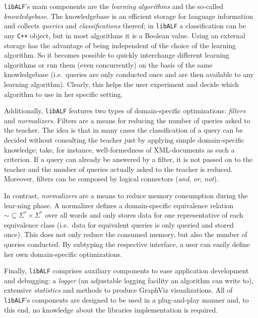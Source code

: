 \documentclass[a4paper, fontsize=11pt, DIV=12, parskip=half]{scrartcl}
\newcommand{\libalf}{\texttt{libALF}\xspace}
\newcommand{\cpp}{\texttt{C+$\!$+}\xspace}
\begin{document}
\libalf's main components are the \emph{learning algorithms} and the so-called \emph{knowledgebase}. The knowledgebase is an efficient storage for language information and collects \emph{queries} and \emph{classifications} thereof; in \libalf a classification can be any \cpp object, but in most algorithms it is a Boolean value. Using an external storage has the advantage of being independent of the choice of the learning algorithm. So it becomes possible to quickly interchange different learning algorithms or run them (even concurrently) on the basis of the same knowledgebase (i.e.\ queries are only conducted once and are then available to any learning algorithm). Clearly, this helps the user experiment and decide which algorithm to use in her specific setting.

Additionally, \libalf features two types of domain-specific optimizations: \emph{filters} and \emph{normalizers}. Filters are a means for reducing the number of queries asked to the teacher. The idea is that in many cases the classification of a query can be decided without consulting the teacher just by applying simple domain-specific knowledge; take, for instance, well-formedness of XML-documents as such a criterion. If a query can already be answered by a filter, it is not passed on to the teacher and the number of queries actually asked to the teacher is reduced. Moreover, filters can be composed by logical connectors (\emph{and}, \emph{or}, \emph{not}).

In contrast, \emph{normalizers} are a means to reduce memory consumption during the lear-\linebreak ning phase. A normalizer defines a domain-specific equivalence relation $\sim \subseteq \Sigma^\ast \times \Sigma^\ast$ over all words and only stores data for one representative of each equivalence class (i.e.\ data for equivalent queries is only queried and stored once). This does not only reduce the consumed memory, but also the number of queries conducted. By subtyping the respective interface, a user can easily define her own domain-specific optimizations.

Finally, \libalf comprises auxiliary components to ease application development and debugging: a \emph{logger} (an adjustable logging facility an algorithm can write to), extensive \emph{statistics} and methods to produce \textsf{GraphViz} visualizations. All of \libalf's components are designed to be used in a plug-and-play manner and, to this end, no knowledge about the libraries implementation is required.



\end{document}
